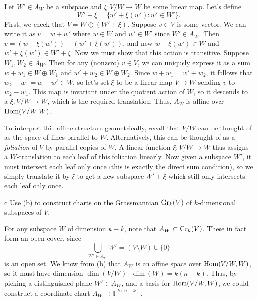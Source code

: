 \documentclass{pset}
\begin{document}
\begin{parts}
  Let $W'\in A_W$ be a subspace and $\xi : V/W \to W$ be some linear map. Let's define
  \[
    W' + \xi = \{ w' + \xi(w') : w'\in W'\}.
  \]
  First, we check that $V = W\oplus(W'+\xi)$. Suppose $v\in V$ is some vector. We can write it as $v = w+w'$ where $w\in W$ and $w'\in W'$ since $W'\in A_W$. Then $v=(w-\xi(w'))+(w'+\xi(w'))$, and now $w-\xi(w')\in W$ and $w'+\xi(w')\in W'+\xi$. Now we must show that this action is transitive. Suppose $W_1, W_2\in A_W$. Then for any (nonzero) $v\in V$, we can uniquely express it as a sum $w+w_1\in W\oplus W_1$ and $w'+w_2 \in W\oplus W_2$. Since $w+w_1=w'+w_2$, it follows that $w_2-w_1=w-w'\in W$, so let's set $\xi$ to be a linear map $V \to W$ sending $v$ to $w_2 - w_1$. This map is invariant under the quotient action of $W$, so it descends to a $\xi : V/W \to W$, which is the required translation. Thus, $A_W$ is affine over $\textrm{Hom}(V/W, W)$.

  To interpret this affine structure geometrically, recall that $V/W$ can be thought of as the space of lines parallel to $W$. Alternatively, this can be thought of as a \emph{foliation} of $V$ by parallel copies of $W$. A linear function $\xi : V/W \to W$ thus assigns a $W$-translation to each leaf of this foliation linearly. Now given a subspace $W'$, it must intersect each leaf only once (this is exactly the direct sum condition), so we simply translate it by $\xi$ to get a new subspace $W'+\xi$ which still only intersects each leaf only once.

  \begin{part}{c}
    Use (b) to construct charts on the Grassmannian $\textrm{Gr}_k(V)$ of $k$-dimensional subspaces of $V$. %
  \end{part}

  For any subspace $W$ of dimension $n-k$, note that $A_W \subset \textrm{Gr}_k(V)$. These in fact form an open cover, since 
  \[
    \bigcup_{W'\in A_W} W' = (V\setminus W)\cup\{0\}
  \]
  is an open set. We know from (b) that $A_W$ is an affine space over $\textrm{Hom}(V/W, W)$, so it must have dimension $\dim(V/W)\cdot \dim(W) = k(n-k)$. Thus, by picking a distinguished plane $W'\in A_W$, and a basis for $\textrm{Hom}(V/W, W)$, we could construct a coordinate chart $A_W \to \mathbb{F}^{k(n-k)}$. 



\end{parts}
\end{document}
